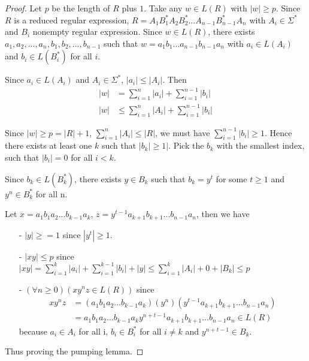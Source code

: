\documentclass[11pt]{article}
\theoremstyle{definition}
\begin{document}
\begin{proof}
Let $p$ be the length of $R$ plus $1$. Take any $w\in L(R)$ with $|w|\geq p$. Since $R$ is a reduced regular expression, $R = A_1B_1^*A_2B_2^*...A_{n-1}B_{n-1}^*A_n$ with $A_i \in \Sigma^*$ and $B_i$ nonempty regular expression. Since $w \in L(R)$, there exists $a_1, a_2, ... ,a_n, b_1, b_2, ...,b_{n-1}$ such that $w = a_1b_1 ... a_{n-1}b_{n-1}a_n$ with $a_i \in L(A_i)$ and $b_i\in L(B_i^*)$ for all $i$.

Since $a_i \in L(A_i)$ and $A_i \in \Sigma^*$, $|a_i| \leq |A_i|$. Then 
\begin{align*}
    |w| &= \sum_{i=1}^n{|a_i|} + \sum_{i=1}^{n-1}{|b_i|}\\
    |w| &\leq \sum_{i=1}^n{|A_i|} + \sum_{i=1}^{n-1}{|b_i|}
\end{align*}

Since $|w| \geq p = |R| + 1$, $\sum_{i=1}^n{|A_i|} \leq |R|$, we must have $\sum_{i=1}^{n-1}{|b_i|} \geq 1$. Hence there exists at least one $k$ such that $|b_k| \geq 1|$. Pick the $b_k$ with the smallest index, such that $|b_i| = 0$ for all $i < k$.

Since $b_k \in L(B_k^*)$, there exists $y\in B_k$ such that $b_k = y^t$ for some $t\geq 1$ and $y^n \in B_k ^*$ for all n. 

Let $x = a_1b_1a_2 ... b_{k-1}a_k$, $z = y^{t-1}a_{k+1}b_{k+1}...b_{n-1}a_n$, then we have
\begin{enumerate}
    \item[-] $|y| \geq = 1$ since $|y^t| \geq 1$.
    \item[-] $|xy|\leq p$ since $|xy| = \sum_{i=1}^{k}|a_i| + \sum_{i=1}^{k-1}|b_i| + |y| \leq \sum_{i=1}^{k}|A_i| + 0 + |B_k| \leq p$
    \item[-] $(\forall n\geq 0)(xy^nz\in L(R))$ since 
    \begin{align*}
        xy^nz &= (a_1b_1a_2 ... b_{k-1}a_k)(y^n)(y^{t-1}a_{k+1}b_{k+1}...b_{n-1}a_n)\\
        &= a_1b_1a_2 ... b_{k-1}a_ky^{n +t-1}a_{k+1}b_{k+1}...b_{n-1}a_n \in L(R)
    \end{align*}
    because $a_i\in A_i$ for all i, $b_i \in B_i^*$ for all $i \neq k$ and $y^{n +t-1} \in B_k$.
\end{enumerate}
Thus proving the pumping lemma.
\end{proof}
\end{document}
